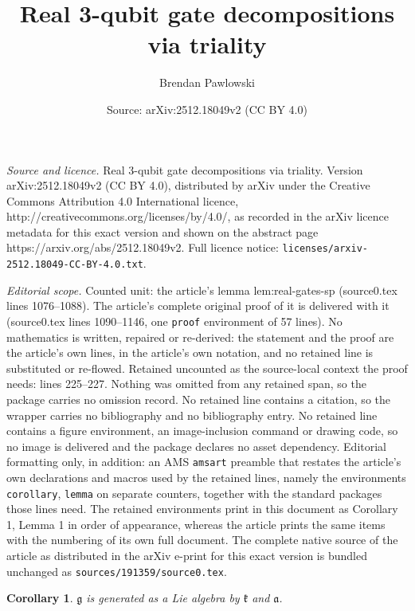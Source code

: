 \documentclass[10pt,a4paper]{amsart}
\title{Real 3-qubit gate decompositions via triality}
\author{Brendan Pawlowski}
\date{Source: arXiv:2512.18049v2 (CC BY 4.0)}
\newtheorem{corollary}{Corollary}
\renewcommand{\a}{\mathfrak{a}}
\newcommand{\g}{\mathfrak{g}}
\renewcommand{\k}{\mathfrak{k}}
\begin{document}
\maketitle

\noindent\emph{Source and licence.} Real 3-qubit gate decompositions via triality. Version arXiv:2512.18049v2 (CC BY 4.0), distributed by arXiv under the Creative Commons Attribution 4.0 International licence, http://creativecommons.org/licenses/by/4.0/, as recorded in the arXiv licence metadata for this exact version and shown on the abstract page https://arxiv.org/abs/2512.18049v2. Full licence notice: \texttt{licenses/arxiv-2512.18049-CC-BY-4.0.txt}.\par\smallskip

\noindent\textit{Editorial scope.} Counted unit: the article's lemma lem:real-gates-sp (source0.tex lines 1076--1088). The article's complete original proof of it is delivered with it (source0.tex lines 1090--1146, one \texttt{proof} environment of 57 lines). No mathematics is written, repaired or re-derived: the statement and the proof are the article's own lines, in the article's own notation, and no retained line is substituted or re-flowed.  Retained uncounted as the source-local context the proof needs: lines 225--227.  Nothing was omitted from any retained span, so the package carries no omission record.  No retained line contains a citation, so the wrapper carries no bibliography and no bibliography entry.  No retained line contains a figure environment, an image-inclusion command or drawing code, so no image is delivered and the package declares no asset dependency.  Editorial formatting only, in addition: an AMS \texttt{amsart} preamble that restates the article's own declarations and macros used by the retained lines, namely the environments \texttt{corollary}, \texttt{lemma} on separate counters, together with the standard packages those lines need.  The retained environments print in this document as Corollary 1, Lemma 1 in order of appearance, whereas the article prints the same items with the numbering of its own full document.  The complete native source of the article as distributed in the arXiv e-print for this exact version is bundled unchanged as \texttt{sources/191359/source0.tex}.
\begin{corollary} \label{cor:ka}
$\g$ is generated as a Lie algebra by $\k$ and $\a$.
\end{corollary}
\end{document}
